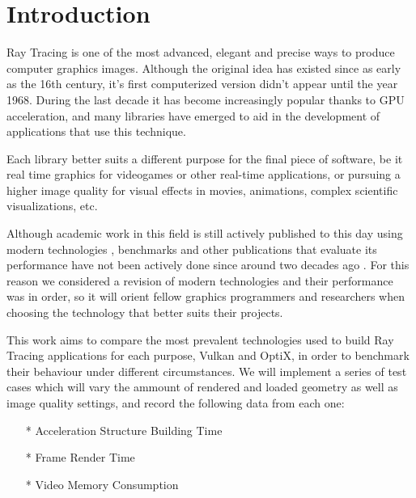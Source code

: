 

\chapter{Introduction}

Ray Tracing is one of the most advanced, elegant and precise ways to produce computer graphics images. Although the original idea has existed since as early as the 16th century, it's first computerized version didn't appear until the year 1968. During the last decade it has become increasingly popular thanks to GPU acceleration, and many libraries have emerged to aid in the development of applications that use this technique.

Each library better suits a different purpose for the final piece of software, be it real time graphics for videogames or other real-time applications, or pursuing a higher image quality for visual effects in movies, animations, complex scientific visualizations, etc.

Although academic work in this field is still actively published to this day using modern technologies \cite{rileymulti} \cite{wei2022model}, benchmarks and other publications that evaluate its performance have not been actively done since around two decades ago \cite{lext2001benchmark} \cite{foley2005kd} \cite{wald2007ray}. For this reason we considered a revision of modern technologies and their performance was in order, so it will orient fellow graphics programmers and researchers when choosing the technology that better suits their projects.

This work aims to compare the most prevalent technologies used to build Ray Tracing applications for each purpose, Vulkan and OptiX, in order to benchmark their behaviour under different circumstances. We will implement a series of test cases which will vary the ammount of rendered and loaded geometry as well as image quality settings, and record the following data from each one:

\begin{itemize}
    \item[*] Acceleration Structure Building Time
    \item[*] Frame Render Time
    \item[*] Video Memory Consumption
\end{itemize}

